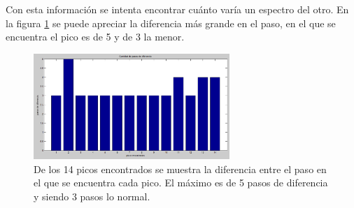 Con esta información se intenta encontrar cuánto varía un espectro del otro. En la figura \ref{fig:pasoserror} se puede apreciar la diferencia más grande en el paso, en el que se encuentra el pico es de 5 y de 3 la menor. %

\begin{figure}[h]
	\centering
	\includegraphics[width=0.8\linewidth,height=4cm]{Imagenes/3/pasosError}
	\caption[Diferencias de pasos en los picos encontrados.]{De los 14 picos encontrados se muestra la diferencia entre el paso en el que se encuentra cada pico. El máximo es de 5 pasos de diferencia y siendo 3 pasos lo normal.}
	\label{fig:pasoserror}
\end{figure}

 

